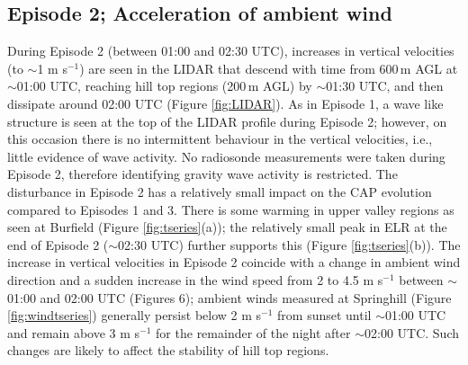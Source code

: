 \documentclass[times]{qjrms4}
\begin{document}
\subsection{Episode 2; Acceleration of ambient wind}
\label{ep2}
During Episode 2 (between 01:00 and 02:30 UTC), increases in vertical velocities (to $\sim$1 m s$^{−1}$)  are seen in the LIDAR that descend with time from 600$\,\mbox{m}$ AGL at $\sim$01:00 UTC, reaching hill top regions (200$\,\mbox{m}$ AGL) by $\sim$01:30 UTC, and then dissipate around 02:00 UTC (Figure \ref{fig:LIDAR}). As in Episode 1, a wave like structure is seen at the top of the LIDAR profile during Episode 2; however, on this occasion there is no intermittent behaviour in the vertical velocities, i.e., little evidence of wave activity. No radiosonde measurements were taken during Episode 2, therefore identifying gravity wave activity is restricted. The disturbance in Episode 2 has a relatively small impact on the CAP evolution compared to Episodes 1 and 3. There is some warming in upper valley regions as seen at Burfield (Figure \ref{fig:tseries}(a)); the relatively small peak in ELR at the end of Episode 2 ($\sim$02:30 UTC) further supports this (Figure \ref{fig:tseries}(b)). The increase in vertical velocities in Episode 2 coincide with a change in ambient wind direction and a sudden increase in the wind speed from 2 to 4.5 m s$^{-1}$ between $\sim$01:00 and 02:00 UTC (Figures 6); ambient winds measured at Springhill (Figure \ref{fig:windtseries}) generally persist below 2 m s$^{-1}$ from sunset until $\sim$01:00 UTC and remain above 3 m s$^{-1}$ for the remainder of the night after $\sim$02:00 UTC. Such changes are likely to affect the stability of hill top regions.
\end{document}
